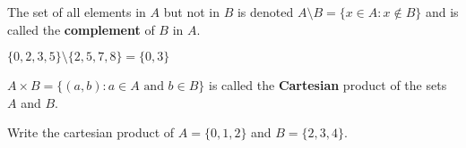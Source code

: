 \documentclass[../main.tex]{subfiles}
\begin{document}
The set of all elements in $A$ but not in $B$ is denoted $A\setminus B=\{x\in A:x\notin B\}$ and is called the \textbf{complement} of $B$ in $A.$

\begin{example}
$\{0,2,3,5\}\setminus \{2,5,7,8\}=\{0,3\}$
\end{example}

$A\times B=\{(a,b):a\in A \text{ and } b\in B\}$ is called the \textbf{Cartesian} product of the sets $A$ and $B$.

\begin{example}
Write the cartesian product of $A=\{0,1,2\}$ and $B=\{2,3,4\}$.
\end{example}
\end{document}
